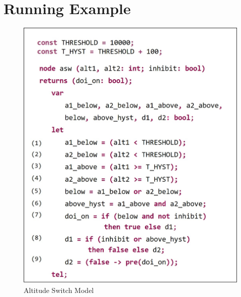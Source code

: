 \section{Running Example}
\label{sec:example}


\begin{figure}
\centering
\includegraphics[width=0.9\columnwidth]{figs/code.jpg}
\vspace{-0.1in}
\caption{Altitude Switch Model }
\label{fig:asw}
\end{figure}


